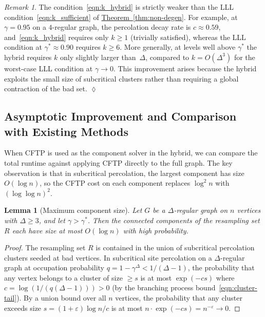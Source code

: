 \documentclass[12pt, a4paper]{article}
\theoremstyle{plain}
\newtheorem{lemma}{Lemma}
\theoremstyle{definition}
\theoremstyle{remark}
\newtheorem{remark}{Remark}
\newcommand{\sref}[2]{\hyperref[#2]{#1~\ref*{#2}}}
\begin{document}
\begin{remark}\normalfont
The condition~\eqref{eqn:k_hybrid} is strictly weaker than the LLL condition~\eqref{eqn:k_sufficient} of \sref{Theorem}{thm:non-degen}. For example, at \(\gamma=0.95\) on a \(4\)-regular graph, the percolation decay rate is \(c\approx0.59\), and~\eqref{eqn:k_hybrid} requires only \(k\geq 1\) (trivially satisfied), whereas the LLL condition at \(\gamma^*\approx0.90\) requires \(k\geq 6\). More generally, at levels well above \(\gamma^*\) the hybrid requires \(k\) only slightly larger than~\(\Delta\), compared to \(k=O(\Delta^3)\) for the worst-case LLL condition at \(\gamma\to0\). This improvement arises because the hybrid exploits the small size of subcritical clusters rather than requiring a global contraction of the bad set.
\hfill\(\lozenge\)
\end{remark}

\subsection{Asymptotic Improvement and Comparison with Existing Methods}\label{sec:hybrid-vs-direct}

When CFTP is used as the component solver in the hybrid, we can compare the total runtime against applying CFTP directly to the full graph. The key observation is that in subcritical percolation, the largest component has size \(O(\log n)\), so the CFTP cost on each component replaces \(\log^2 n\) with \((\log\log n)^2\).

\begin{lemma}[Maximum component size]\label{lem:max-comp}
Let \(G\) be a \(\Delta\)-regular graph on \(n\) vertices with \(\Delta\geq3\), and let \(\gamma>\gamma^*\). Then the connected components of the resampling set \(R\) each have size at most \(O(\log n)\) with high probability.
\end{lemma}
\begin{proof}
The resampling set \(R\) is contained in the union of subcritical percolation clusters seeded at bad vertices. In subcritical site percolation on a \(\Delta\)-regular graph at occupation probability \(q=1-\gamma^\Delta < 1/(\Delta-1)\), the probability that any vertex belongs to a cluster of size \(\geq s\) is at most \(\exp(-cs)\) where \(c = \log(1/(q(\Delta-1)))>0\) (by the branching process bound~\eqref{eqn:cluster-tail}). By a union bound over all \(n\) vertices, the probability that any cluster exceeds size \(s = (1+\varepsilon)\log n / c\) is at most \(n\cdot\exp(-cs) = n^{-\varepsilon}\to 0\).
\end{proof}
\end{document}
